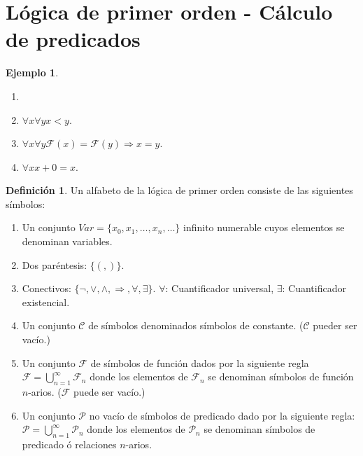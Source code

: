 \documentclass[a4paper,11pt]{article}
\theoremstyle{definition}
\newtheorem{defn}{Definición}[section]
\newtheorem{exap}{Ejemplo}[section]
\theoremstyle{remark}
\begin{document}
\section{Lógica de primer orden - Cálculo de predicados}

\begin{exap}
    \begin{enumerate}
        \item[]
        
        \item $\forall x \forall y x < y$.
        
        \item $\forall x \forall y \mathcal{F}(x) = \mathcal{F}(y) \Rightarrow x = y$.
        
        \item $\forall x x + 0 = x$.
    \end{enumerate}
\end{exap}

\begin{defn}
    Un alfabeto de la lógica de primer orden consiste de las siguientes símbolos:
    
    \begin{enumerate}
        \item Un conjunto $Var = \{x_0, x_1, \dots, x_n, \dots\}$ infinito numerable cuyos
        elementos se denominan variables.
        
        \item Dos paréntesis: $\{(,)\}$.
        
        \item Conectivos: $\{\lnot, \lor, \land, \Rightarrow, \forall, \exists \}$. 
        $\forall$: Cuantificador universal, $\exists$: Cuantificador existencial.
        
        \item Un conjunto $\mathcal C$ de símbolos denominados símbolos de constante. 
        ($\mathcal C$ pueder ser vacío.)
        
        \item Un conjunto $\mathcal F$ de símbolos de función dados por la siguiente regla
        $\mathcal F = \bigcup_{n=1}^{\infty} \mathcal F_n$ donde los elementos de $\mathcal F_n$
        se denominan símbolos de función $n$-arios. ($\mathcal F$ puede ser vacío.)
        
        \item Un conjunto $\mathcal P$ no vacío de símbolos de predicado dado por la 
        siguiente regla: $\mathcal P = \bigcup_{n=1}^{\infty} \mathcal P_n$ donde los elementos de
        $\mathcal P_n$ se denominan símbolos de predicado ó relaciones $n$-arios.
    \end{enumerate}
\end{defn}
\end{document}

